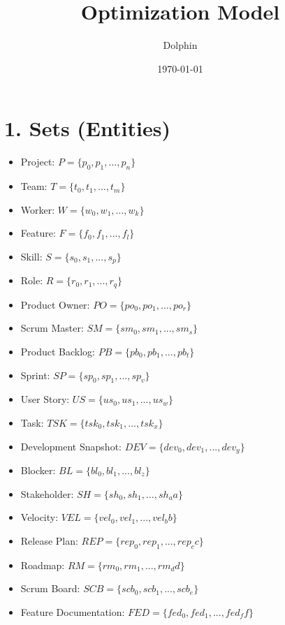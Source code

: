 \documentclass{article}
\title{Optimization Model}
\author{Dolphin}
\date{\today}
\begin{document}
\maketitle

\tableofcontents

\section*{1. Sets (Entities)}
\begin{itemize}
    \item Project: $P = \{p_0, p_1, ..., p_n\}$
    \item Team: $T = \{t_0, t_1, ..., t_m\}$
    \item Worker: $W = \{w_0, w_1, ..., w_k\}$
    \item Feature: $F = \{f_0, f_1, ..., f_l\}$
    \item Skill: $S = \{s_0, s_1, ..., s_p\}$
    \item Role: $R = \{r_0, r_1, ..., r_q\}$
    \item Product Owner: $PO = \{po_0, po_1, ..., po_r\}$
    \item Scrum Master: $SM = \{sm_0, sm_1, ..., sm_s\}$
    \item Product Backlog: $PB = \{pb_0, pb_1, ..., pb_t\}$
    \item Sprint: $SP = \{sp_0, sp_1, ..., sp_v\}$
    \item User Story: $US = \{us_0, us_1, ..., us_w\}$
    \item Task: $TSK = \{tsk_0, tsk_1, ..., tsk_x\}$
    \item Development Snapshot: $DEV = \{dev_0, dev_1, ..., dev_y\}$
    \item Blocker: $BL = \{bl_0, bl_1, ..., bl_z\}$
    \item Stakeholder: $SH = \{sh_0, sh_1, ..., sh_aa\}$
    \item Velocity: $VEL = \{vel_0, vel_1, ..., vel_bb\}$
    \item Release Plan: $REP = \{rep_0, rep_1, ..., rep_cc\}$
    \item Roadmap: $RM = \{rm_0, rm_1, ..., rm_dd\}$
    \item Scrum Board: $SCB = \{scb_0, scb_1, ..., scb_e\}$
    \item Feature Documentation: $FED = \{fed_0, fed_1, ..., fed_ff\}$
\end{itemize}
\end{document}

